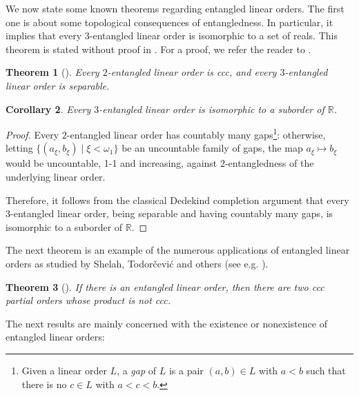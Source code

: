 \documentclass[12pt]{amsart}
\newtheorem{theorem}{Theorem}[section]
\newtheorem{corollary}[theorem]{Corollary}
\theoremstyle{definition}
\theoremstyle{remark}
\begin{document}
We now state some known theorems regarding entangled linear orders. The first one is about some topological consequences of entangledness. In particular, it implies that every $3$-entangled linear order is isomorphic to a set of reals. This theorem is stated without proof in \cite{MR799818}. For a proof, we refer the reader to \cite{MR4080091}.

\begin{theorem}[\cite{MR799818}]
Every $2$-entangled linear order is ccc, and every $3$-entangled linear order is separable.
\end{theorem}
\begin{corollary}
Every $3$-entangled linear order is isomorphic to a suborder of $\mathbb{R}$.
\end{corollary}
\begin{proof}
Every $2$-entangled linear order has countably many gaps\footnote{Given a linear order $L$, a \emph{gap} of $L$ is a pair $(a,b) \in L$ with $a < b$ such that there is no $c \in L$ with $a < c < b$.}: otherwise, letting $\{ (a_\xi, b_\xi) \mid \xi < \omega_1\}$ be an uncountable family of gaps, the map $a_\xi \mapsto b_\xi$ would be uncountable, 1-1 and increasing, against $2$-entangledness of the underlying linear order. 

Therefore, it follows from the classical Dedekind completion argument that every $3$-entangled linear order, being separable and having countably many gaps, is isomorphic to a suborder of $\mathbb{R}$.
\end{proof}

The next theorem is an example of the numerous applications of entangled linear orders as studied by Shelah, Todor{\v c}evi{\'c} and others (see e.g. \cite{MR799818, MR776283, MR1467577, MR1812182, chapital2025nentangledsetn1entangledsets}).

\begin{theorem}[\cite{MR799818}]
If there is an entangled linear order, then there are two ccc partial
orders whose product is not ccc.
\end{theorem}

The next results are mainly concerned with the existence or nonexistence of entangled linear orders:
\end{document}
